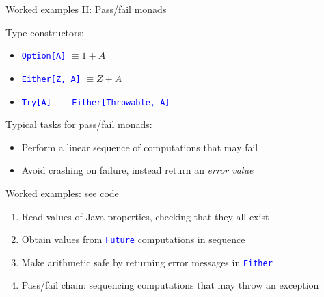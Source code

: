 \documentclass[english]{beamer}
\begin{document}
\begin{frame}{Worked examples II: Pass/fail monads}

Type constructors:
\begin{itemize}
\item \texttt{\textcolor{blue}{\footnotesize{}Option{[}A{]}}} $\equiv1+A$
\item \texttt{\textcolor{blue}{\footnotesize{}Either{[}Z, A{]}}} $\equiv Z+A$
\item \texttt{\textcolor{blue}{\footnotesize{}Try{[}A{]}}} $\equiv$\texttt{\textcolor{blue}{\footnotesize{}
Either{[}Throwable, A{]}}} 
\end{itemize}
Typical tasks for pass/fail monads:
\begin{itemize}
\item Perform a linear sequence of computations that may fail
\item Avoid crashing on failure, instead return an \emph{error value}
\end{itemize}
Worked examples: see code
\begin{enumerate}
\item Read values of Java properties, checking that they all exist
\item Obtain values from \texttt{\textcolor{blue}{\footnotesize{}Future}}
computations in sequence
\item Make arithmetic safe by returning error messages in \texttt{\textcolor{blue}{\footnotesize{}Either}} 
\item Pass/fail chain: sequencing computations that may throw an exception
\end{enumerate}
\end{frame}
\end{document}
